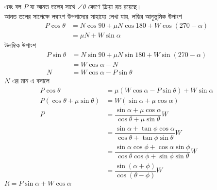 \documentclass{article}
\begin{document}
এবং বল $P$ যা আনত তলের সাথে $\angle \theta$ কোণে ক্রিয়া রত রয়েছে।\\
আনত তলের সাপেক্ষে লম্বাংশ উপপাদ্যের সাহায্যে লেখা যায়, লদ্ধির আনুভূমিক উপাংশ
\begin{equation}
\begin{split}
P\cos \theta &=N\cos 90 +\mu N \cos 180 + W\cos (270-\alpha) \\&= \mu N  + W\sin \alpha 
\end{split}
\end{equation} 
 উলম্বিক উপাংশ
\begin{equation}
\begin{split}
P\sin \theta &=N\sin 90 +\mu N \sin 180 + W\sin (270-\alpha) \\&=  W\cos \alpha -N \\N &= W\cos \alpha - P\sin \theta  
\end{split}
\end{equation} 
$N$ এর মান এ বসালে\\
\begin{equation}
\begin{split}
P\cos \theta &= \mu (W\cos \alpha - P\sin \theta)  + W\sin \alpha\\P (\cos \theta + \mu\sin \theta) &= W(\sin\alpha + \mu\cos \alpha)\\P &= \dfrac{\sin \alpha + \mu\cos\alpha}{\cos\theta + \mu \sin\theta}W\\&=  \dfrac{\sin \alpha + \tan \phi \cos\alpha}{\cos\theta + \tan\phi \sin\theta}W\\&= \dfrac{\sin \alpha\cos\phi + \cos\alpha\sin\phi}{\cos\theta\cos\phi + \sin\phi \sin\theta}W\\&= \dfrac{\sin (\alpha +\phi)}{\cos(\theta -\phi)}W
\end{split}
\end{equation} 
$R = P\sin \alpha +W \cos \alpha$
\end{document}
